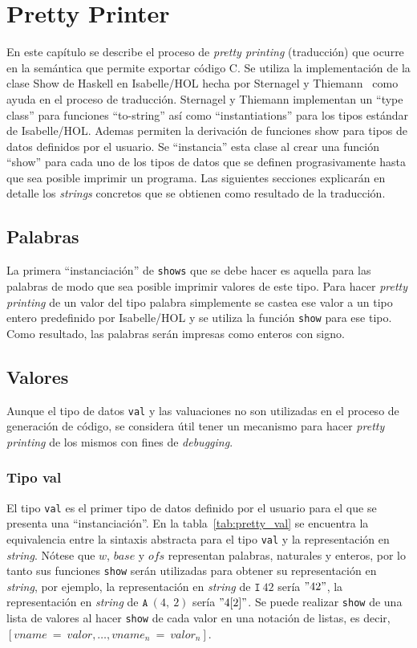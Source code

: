 \chapter{Pretty Printer}\label{chapter:pretty}

En este capítulo se describe el proceso de \textit{pretty printing} (traducción) que ocurre en la semántica que permite exportar código C.
Se utiliza la implementación de la clase Show de Haskell en Isabelle/HOL hecha por Sternagel y Thiemann~\cite{Show-AFP} como ayuda en el proceso de traducción.
Sternagel y Thiemann implementan un ``type class'' para funciones ``to-string'' así como ``instantiations'' para los tipos estándar de Isabelle/HOL.
Ademas permiten la derivación de funciones show para tipos de datos definidos por el usuario.
Se ``instancia'' esta clase al crear una función ``show'' para cada uno de los tipos de datos que se definen prograsivamente hasta que sea posible imprimir un programa.
Las siguientes secciones explicarán en detalle los \textit{strings} concretos que se obtienen como resultado de la traducción.

\section{Palabras}\label{section:pretty_words}
La primera ``instanciación'' de \verb|shows| que se debe hacer es aquella para las palabras de modo que sea posible imprimir valores de este tipo.
Para hacer \textit{pretty printing} de un valor del tipo palabra simplemente se castea ese valor a un tipo entero predefinido por Isabelle/HOL y se utiliza la función \verb|show| para ese tipo.
Como resultado, las palabras serán impresas como enteros con signo.

\section{Valores}\label{section:pretty_values}

Aunque el tipo de datos \verb|val| y las valuaciones no son utilizadas en el proceso de generación de código, se considera útil tener un mecanismo para hacer \textit{pretty printing} de los mismos con fines de \textit{debugging}.

\subsection{Tipo val}\label{subsection:pretty_val_type}
El tipo \verb|val| es el primer tipo de datos definido por el usuario para el que se presenta una ``instanciación''.
En la tabla~\ref{tab:pretty_val} se encuentra la equivalencia entre la sintaxis abstracta para el tipo \verb|val| y la representación en \textit{string}.
Nótese que $w$, $base$ y $ofs$ representan palabras, naturales y enteros, por lo tanto sus funciones \verb|show| serán utilizadas para obtener su representación en \textit{string}, por ejemplo, la representación en \textit{string} de $\mathtt{I}\ 42$ sería $"42"$, la representación en \textit{string} de $\mathtt{A}\ (4,\ 2)$ sería $"4[2]"$.
Se puede realizar \verb|show| de una lista de valores al hacer \verb|show| de cada valor en una notación de listas, es decir, $[vname\ =\ valor, \dots, vname_n\ =\ valor_n]$.

